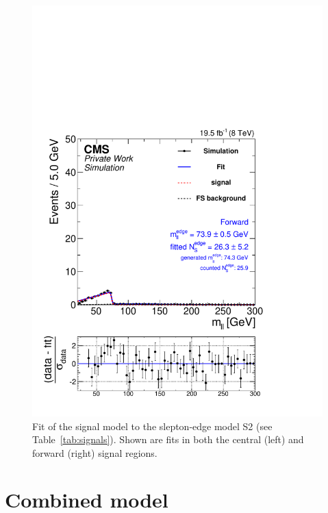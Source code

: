 \begin{figure}[hbp]
\begin{minipage}[t]{0.49\textwidth}
    \includegraphics[width=\textwidth]{plots/results/fit/mcFits/shapeIllustrationKTriangle_SignalInclusive_Combined_Full2012_KTriangle_MC_slepton_500_175_100_Forward.pdf}
  \end{minipage}
\caption{Fit of the signal model to the slepton-edge model S2 (see Table~\ref{tab:signals}). Shown are fits in both the central (left) and forward (right) signal regions.}
  \label{fig:signalModel:slepton}
\end{figure}


\section{Combined model}

